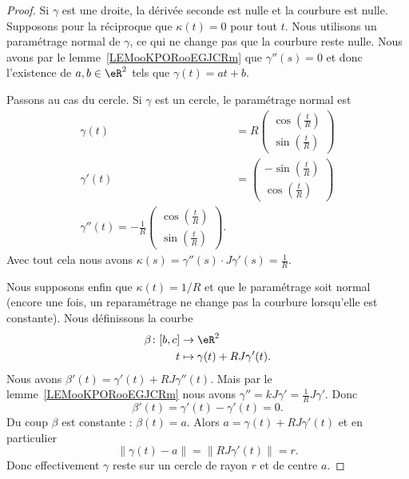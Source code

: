\begin{proof}
	Si \( \gamma\) est une droite, la dérivée seconde est nulle et la courbure est nulle. Supposons pour la réciproque que \( \kappa(t)=0\) pour tout \( t\). Nous utilisons un paramétrage normal de \( \gamma\), ce qui ne change pas que la courbure reste nulle. Nous avons par le lemme~\ref{LEMooKPORooEGJCRm} que \( \gamma''(s)=0\) et donc l'existence de \( a,b\in \eR^2\) tels que \( \gamma(t)=at+b\).

	Passons au cas du cercle. Si \( \gamma\) est un cercle, le paramétrage normal est
	\begin{subequations}
		\begin{align}
			\gamma(t)  & =R\begin{pmatrix}
				               \cos(\frac{ t }{ R }) \\
				               \sin(\frac{ t }{ R })
			               \end{pmatrix} \\
			\gamma'(t) & =\begin{pmatrix}
				              -\sin(\frac{ t }{ R }) \\
				              \cos(\frac{ t }{ R })
			              \end{pmatrix} \\
			\gamma''(t)=-\frac{1}{ R }\begin{pmatrix}
				                          \cos(\frac{ t }{ R }) \\
				                          \sin(\frac{ t }{ R })
			                          \end{pmatrix}.
		\end{align}
	\end{subequations}
	Avec tout cela nous avons \( \kappa(s)=\gamma''(s)\cdot J\gamma'(s)=\frac{1}{ R }\).

	Nous supposons enfin que \( \kappa(t)=1/R\) et que le paramétrage soit normal (encore une fois, un reparamétrage ne change pas la courbure lorsqu'elle est constante). Nous définissons la courbe
	\begin{equation}
		\begin{aligned}
			\beta\colon \mathopen[ b , c \mathclose] & \to \eR^2                       \\
			t                                        & \mapsto \gamma(t)+RJ\gamma'(t).
		\end{aligned}
	\end{equation}
	Nous avons \( \beta'(t)=\gamma'(t)+RJ\gamma''(t)\). Mais par le lemme~\ref{LEMooKPORooEGJCRm} nous avons \( \gamma''=kJ\gamma'=\frac{1}{ R }J\gamma'\). Donc
	\begin{equation}
		\beta'(t)=\gamma'(t)-\gamma'(t)=0.
	\end{equation}
	Du coup \( \beta\) est constante : \( \beta(t)=a\). Alors \( a=\gamma(t)+RJ\gamma'(t)\) et en particulier
	\begin{equation}
		\| \gamma(t)-a \|=\| RJ\gamma'(t) \|=r.
	\end{equation}
	Donc effectivement \( \gamma\) reste sur un cercle de rayon \( r\) et de centre \( a\).
\end{proof}

